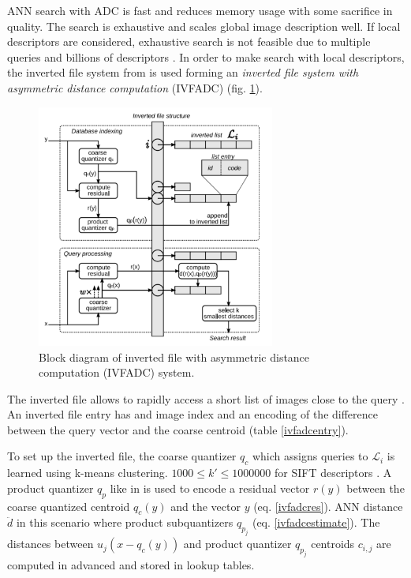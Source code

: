 \documentclass[english,12pt,a4paper,pdftex,elec,utf8]{aaltothesis}
\begin{document}
ANN search with ADC is fast and reduces memory usage with some sacrifice in quality. The search is exhaustive and scales global image description well. If local descriptors are considered, exhaustive search is not feasible due to multiple queries and billions of descriptors \cite{Jegou2008}. In order to make search with local descriptors, the inverted file system from \cite{Sivic2003} is used forming an \emph{inverted file system with asymmetric distance computation} (IVFADC) (fig. \ref{ivfadcfig}).

\begin{figure}[htb]
\begin{center}
\includegraphics[height=8cm]{figures/ivfadc}
\end{center}
\caption{Block diagram of inverted file with asymmetric distance computation (IVFADC) system. \cite{Jegou2008}}
\label{ivfadcfig}
\end{figure}

The inverted file allows to rapidly access a short list of images close to the query \cite{Jegou2008}. An inverted file entry has and image index and an encoding of the difference between the query vector and the coarse centroid (table \ref{ivfadcentry}).

To set up the inverted file, the coarse quantizer $q_c$ which assigns queries to $\mathcal{L}_i$ is learned using k-means clustering. $1000 \leq k' \leq 1000000$ for SIFT descriptors \cite{Jegou2008}. A product quantizer $q_p$ like in \cite{Sivic2003} is used to encode a residual vector $r(y)$ between the coarse quantized centroid $q_c(y)$ and the vector $y$ (eq. \ref{ivfadcres}). ANN distance $\ddot{d}$ in this scenario where product subquantizers $q_{p_j}$ (eq. \ref{ivfadcestimate}). The distances between $u_j(x-q_c(y))$
and product quantizer $q_{p_j}$ centroids $c_{i,j}$ are computed in advanced and stored in lookup tables. \cite{Jegou2008}
\end{document}
